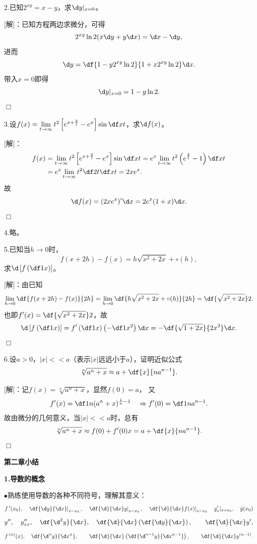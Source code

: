 \bigskip

2.已知$2^{xy}=x-y$，求$\d y|_{x=0}$。

[解]：已知方程两边求微分，可得
$$2^{xy}\ln2(x\d y+y\d x)=\d x-\d y,$$
进而
$$\d y=\df{1-y2^{xy}\ln2}{1+x2^{xy}\ln2}\d x.$$
带入$x=0$即得
$$\d y|_{x=0}=1-y\ln2.$$
\hfill$\Box$

\bigskip

3.设$f(x)=\lim\limits_{t\to\infty}t^2
\left[e^{x+\frac2t}-e^x\right]\sin\df xt$，求$\d f(x)$。

[解]：
\begin{align*}
	f(x)&=\lim\limits_{t\to\infty}t^2
	\left[e^{x+\frac2t}-e^x\right]\sin\df xt
	=e^x\lim\limits_{t\to\infty}t^2
	\left(e^{\frac2t}-1\right)\df xt\\
	&=e^x\lim\limits_{t\to\infty}t^2\df2t\df xt
	=2xe^x.
\end{align*}
故
$$\d f(x)=(2xe^x)'\d x=2e^x(1+x)\d x.$$
\hfill$\Box$

\bigskip

4.略。

5.已知当$h\to 0$时，
$$f(x+2h)-f(x)=h\sqrt{x^2+2x}+\circ(h),$$
求$\d\left[f\left(\df1x\right)\right]$。

[解]：由已知
$$\lim\limits_{h\to0}\df{f(x+2h)-f(x)}{2h}
=\lim\limits_{h\to0}\df{h\sqrt{x^2+2x}+\circ(h)}{2h}
=\df{\sqrt{x^2+2x}}2.
$$
也即$f'(x)=\df{\sqrt{x^2+2x}}2$，故
$$\d\left[f\left(\df1x\right)\right]
=f'\left(\df1x\right)\left(-\df1{x^2}\right)\d x
=-\df{\sqrt{1+2x}}{2x^3}\d x.$$
\hfill$\Box$

\bigskip

6.设$a>0$，$|x|<<a$（表示$|x|$远远小于$a$），证明近似公式
$$\sqrt[n]{a^n+x}\approx a+\df{x}{na^{n-1}}.$$

[解]：记$f(x)=\sqrt[n]{a^n+x}$，显然$f(0)=a$，
又
$$f'(x)=\df1n(a^n+x)^{\frac1n-1}\quad
\Rightarrow f'(0)=\df1{na^{n-1}}.
$$
故由微分的几何意义，当$|x|<<a$时，总有
$$\sqrt[n]{a^n+x}\approx f(0)+f'(0)x
=a+\df{x}{na^{n-1}}.$$
\hfill$\Box$

\newpage

\begin{center}
	\Large\bf 第二章小结
\end{center}

{\bf 1.导数的概念}

$\bullet$熟练使用导数的各种不同符号，理解其意义：
$$f\,'(x_0),\quad \left.\df{\d y}{\d x}\right|_{x=x_0},\quad\left.\df{\d
}{\d x}y\right|_{x=x_0},\quad \left.\df{\d }{\d x}f(x)\right|_{x=x_0}\quad
y'_x|_{x=x_0},\quad \dot{y}(x_0)$$
$$y'',\quad y''_{xx},\quad \df{\d^2y}{\d x},
\quad \df{\d}{\d x}\left(\df{\d y}{\d x}\right),\quad
\quad \df{\d}{\d x}y',$$
$$f^{\,(n)}(x),\quad \df{\d^n y}{\d x^n},\quad
\quad \df{\d}{\d x}\left(\df{\d^{n-1} y}{\d x^{n-1}}\right),\quad
\quad \df{\d}{\d x}y^{(n-1)}.$$

